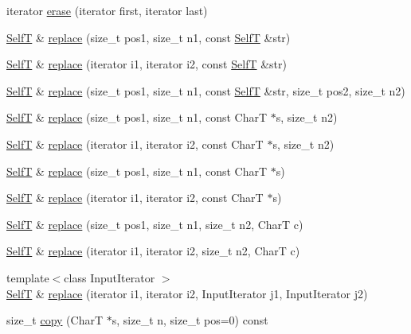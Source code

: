 \begin{CompactItemize}
iterator \hyperlink{classbbt__string_095d97e82bab15718a353ab0f9ec3a4f}{erase} (iterator first, iterator last)
\item 
\hyperlink{classbbt__string}{SelfT} \& \hyperlink{classbbt__string_e00ce88ee9fb5e57bdd03b293752cd1a}{replace} (size\_\-t pos1, size\_\-t n1, const \hyperlink{classbbt__string}{SelfT} \&str)
\item 
\hyperlink{classbbt__string}{SelfT} \& \hyperlink{classbbt__string_51dbd7d4611fe6d60c4238786281d25e}{replace} (iterator i1, iterator i2, const \hyperlink{classbbt__string}{SelfT} \&str)
\item 
\hyperlink{classbbt__string}{SelfT} \& \hyperlink{classbbt__string_56380b00db98648281e47a98db7877b9}{replace} (size\_\-t pos1, size\_\-t n1, const \hyperlink{classbbt__string}{SelfT} \&str, size\_\-t pos2, size\_\-t n2)
\item 
\hyperlink{classbbt__string}{SelfT} \& \hyperlink{classbbt__string_2855c7c1db09f625b3d0fc7311a61923}{replace} (size\_\-t pos1, size\_\-t n1, const CharT $\ast$s, size\_\-t n2)
\item 
\hyperlink{classbbt__string}{SelfT} \& \hyperlink{classbbt__string_1e73d6742c06f347e28afdfc9a9c3a6c}{replace} (iterator i1, iterator i2, const CharT $\ast$s, size\_\-t n2)
\item 
\hyperlink{classbbt__string}{SelfT} \& \hyperlink{classbbt__string_1bca4b60b45b77a1c806d63f8d441082}{replace} (size\_\-t pos1, size\_\-t n1, const CharT $\ast$s)
\item 
\hyperlink{classbbt__string}{SelfT} \& \hyperlink{classbbt__string_682dfcac635e137557d90c4c2d960c69}{replace} (iterator i1, iterator i2, const CharT $\ast$s)
\item 
\hyperlink{classbbt__string}{SelfT} \& \hyperlink{classbbt__string_146596df06229f2f8b4984a44b07d6dc}{replace} (size\_\-t pos1, size\_\-t n1, size\_\-t n2, CharT c)
\item 
\hyperlink{classbbt__string}{SelfT} \& \hyperlink{classbbt__string_7125b62da40b819bc3780a759664f668}{replace} (iterator i1, iterator i2, size\_\-t n2, CharT c)
\item 
{\footnotesize template$<$class InputIterator $>$ }\\\hyperlink{classbbt__string}{SelfT} \& \hyperlink{classbbt__string_8bf848ea75290e5ddfe4983b71919efb}{replace} (iterator i1, iterator i2, InputIterator j1, InputIterator j2)
\item 
size\_\-t \hyperlink{classbbt__string_0873ce9d57fa0817c63678cf42bb6ff6}{copy} (CharT $\ast$s, size\_\-t n, size\_\-t pos=0) const 

\end{CompactItemize}
